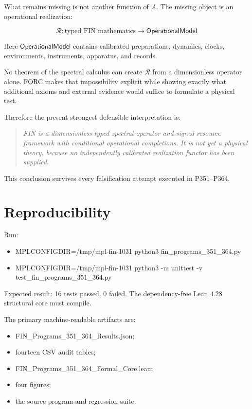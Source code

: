 \documentclass[11pt,a4paper,openany]{report}
\begin{document}
What remains missing is not another function of \(A\). The missing object is an operational realization:

\[
\boxed{
\mathcal R:
\text{typed FIN mathematics}
\longrightarrow
\mathsf{OperationalModel}
}
\]

Here \(\mathsf{OperationalModel}\) contains calibrated preparations, dynamics, clocks, environments, instruments, apparatus, and records.

No theorem of the spectral calculus can create \(\mathcal R\) from a dimensionless operator alone. FORC makes that impossibility explicit while showing exactly what additional axioms and external evidence would suffice to formulate a physical test.

Therefore the present strongest defensible interpretation is:

\begin{quote}\itshape
FIN is a dimensionless typed spectral-operator and signed-resource framework with conditional operational completions. It is not yet a physical theory, because no independently calibrated realization functor has been supplied.

\end{quote}

This conclusion survives every falsification attempt executed in P351--P364.

\chapter{Reproducibility}

Run:

\begin{itemize}
\item 
MPLCONFIGDIR=/\allowbreak{}tmp/\allowbreak{}mpl-fin-1031 python3 fin\_programs\_351\_364.py

\item 
MPLCONFIGDIR=/\allowbreak{}tmp/\allowbreak{}mpl-fin-1031 python3 -m unittest -v test\_fin\_programs\_351\_364.py

\end{itemize}

Expected result: 16 tests passed, 0 failed. The dependency-free Lean 4.28 structural core must compile.

The primary machine-readable artifacts are:

\begin{itemize}
\item 
FIN\_Programs\_351\_364\_Results.json;

\item 
fourteen CSV audit tables;

\item 
FIN\_Programs\_351\_364\_Formal\_Core.lean;

\item 
four figures;

\item 
the source program and regression suite.

\end{itemize}
\end{document}
